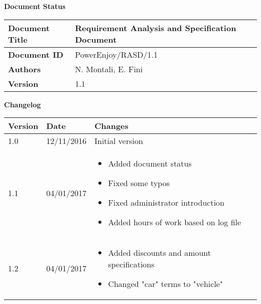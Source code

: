 \textbf{\Huge Document Status}
\begin{center}
    \begin{tabular}{ | l | p{10cm} |}
    \hline
    \textbf{Document Title} & Requirement Analysis and Specification Document \\ \hline
    \textbf{Document ID} & PowerEnjoy/RASD/1.1 \\ \hline
    \textbf{Authors} & N. Montali, E. Fini \\ \hline
    \textbf{Version} & 1.1 \\ \hline
    \end{tabular}
\textbf{\Large Changelog}
     \begin{tabular}{ | l | l | p{10cm} |}
    \hline
    \textbf{Version} & \textbf{Date} & \textbf{Changes} \\ \hline
    1.0 & 12/11/2016 & Initial version \\ \hline
    1.1 & 04/01/2017 & \begin{itemize}
    	\item Added document status 
	\item Fixed some typos
	\item Fixed administrator introduction
	\item Added hours of work based on log file
    \end{itemize}
    \\ \hline
    1.2 & 04/01/2017 & \begin{itemize}
    	\item Added discounts and amount specifications
	\item Changed "car" terms to "vehicle"
    \end{itemize}
    \end{tabular}
\end{center}